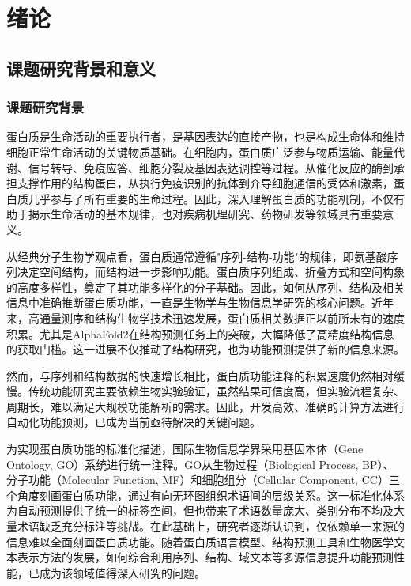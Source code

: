 
\chapter{绪论}

\section{课题研究背景和意义}

\subsection{课题研究背景}

蛋白质是生命活动的重要执行者，是基因表达的直接产物，也是构成生命体和维持细胞正常生命活动的关键物质基础\cite{eisenberg2000protein}。在细胞内，蛋白质广泛参与物质运输、能量代谢、信号转导、免疫应答、细胞分裂及基因表达调控等过程。从催化反应的酶到承担支撑作用的结构蛋白，从执行免疫识别的抗体到介导细胞通信的受体和激素，蛋白质几乎参与了所有重要的生命过程。因此，深入理解蛋白质的功能机制，不仅有助于揭示生命活动的基本规律，也对疾病机理研究、药物研发等领域具有重要意义。

从经典分子生物学观点看，蛋白质通常遵循"序列-结构-功能"的规律，即氨基酸序列决定空间结构，而结构进一步影响功能。蛋白质序列组成、折叠方式和空间构象的高度多样性，奠定了其功能多样化的分子基础。因此，如何从序列、结构及相关信息中准确推断蛋白质功能，一直是生物学与生物信息学研究的核心问题。近年来，高通量测序和结构生物学技术迅速发展，蛋白质相关数据正以前所未有的速度积累。尤其是AlphaFold2\cite{jumper2021highly}在结构预测任务上的突破，大幅降低了高精度结构信息的获取门槛。这一进展不仅推动了结构研究，也为功能预测提供了新的信息来源。

然而，与序列和结构数据的快速增长相比，蛋白质功能注释的积累速度仍然相对缓慢\cite{friedberg2006automated}。传统功能研究主要依赖生物实验验证，虽然结果可信度高，但实验流程复杂、周期长，难以满足大规模功能解析的需求\cite{lin2024comprehensive}。因此，开发高效、准确的计算方法进行自动化功能预测，已成为当前亟待解决的关键问题。

为实现蛋白质功能的标准化描述，国际生物信息学界采用基因本体（Gene Ontology, GO）系统进行统一注释\cite{ashburner2000gene}。GO从生物过程（Biological Process, BP）、分子功能（Molecular Function, MF）和细胞组分（Cellular Component, CC）三个角度刻画蛋白质功能，通过有向无环图组织术语间的层级关系。这一标准化体系为自动预测提供了统一的标签空间，但也带来了术语数量庞大、类别分布不均及大量术语缺乏充分标注等挑战。在此基础上，研究者逐渐认识到，仅依赖单一来源的信息难以全面刻画蛋白质功能。随着蛋白质语言模型、结构预测工具和生物医学文本表示方法的发展，如何综合利用序列、结构、域文本等多源信息提升功能预测性能，已成为该领域值得深入研究的问题。

